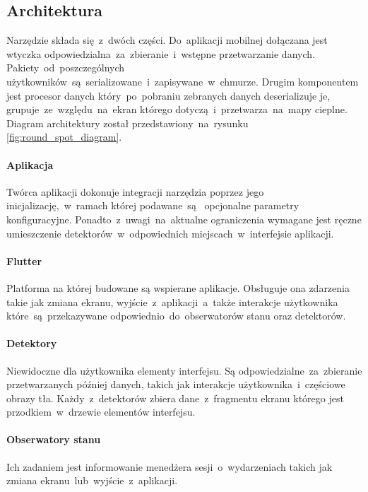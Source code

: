 \subsection{Architektura}
Narzędzie składa się~z~dwóch części. Do~aplikacji mobilnej dołączana jest wtyczka odpowiedzialna~za~zbieranie~i~wstępne przetwarzanie danych. Pakiety~od~poszczególnych użytkowników~są~serializowane~i~zapisywane~w~chmurze. Drugim komponentem jest procesor danych który~po~pobraniu zebranych danych deserializuje je, grupuje~ze~względu~na~ekran którego dotyczą~i~przetwarza~na~mapy cieplne. Diagram architektury został przedstawiony~na~rysunku \ref{fig:round_spot_diagram}.
\bigskip
{}

\paragraph{Aplikacja}
Twórca aplikacji dokonuje integracji narzędzia poprzez jego inicjalizację,~w~ramach której podawane~są~ opcjonalne parametry konfiguracyjne. Ponadto~z~uwagi~na~aktualne ograniczenia wymagane jest ręczne umieszczenie detektorów~w~odpowiednich miejscach~w~interfejsie aplikacji.

\paragraph{Flutter} Platforma na której budowane są wspierane aplikacje. Obsługuje ona zdarzenia takie jak zmiana ekranu, wyjście~z~aplikacji~a~także interakcje użytkownika które~są~przekazywane odpowiednio~do~obserwatorów stanu oraz detektorów.

\paragraph{Detektory} 
\label{par:rs_detectors}
Niewidoczne dla użytkownika elementy interfejsu. Są odpowiedzialne~za~zbieranie przetwarzanych później danych, takich jak interakcje użytkownika~i~częściowe obrazy tła. Każdy~z~detektorów zbiera dane~z~fragmentu ekranu którego jest przodkiem~w~drzewie elementów interfejsu.

\paragraph{Obserwatory stanu} 
\label{par:rs_observers}
Ich zadaniem jest informowanie menedżera sesji~o~wydarzeniach takich jak zmiana ekranu~lub~wyjście~z~aplikacji.

